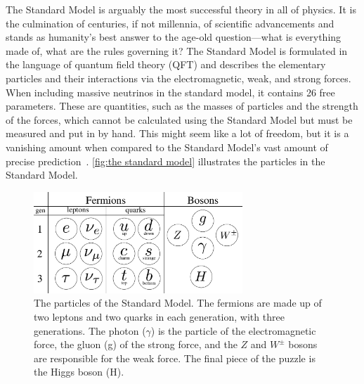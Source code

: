 The Standard Model is arguably the most successful theory in all of physics.
It is the culmination of centuries, if not millennia, of scientific advancements and stands as humanity's best answer to the age-old question---what is everything made of, what are the rules governing it?
The Standard Model is formulated in the language of quantum field theory (QFT) and describes the elementary particles and their interactions via the electromagnetic, weak, and strong forces.
When including massive neutrinos in the standard model, it contains 26 free parameters.
These are quantities, such as the masses of particles and the strength of the forces, which cannot be calculated using the Standard Model but must be measured and put in by hand.
This might seem like a lot of freedom, but it is a vanishing amount when compared to the Standard Model's vast amount of precise prediction~\cite{Schwartz:QFT,griffiths:introduction,kramer:the_standard_model}.
\autoref{fig:the standard model} illustrates the particles in the Standard Model.

\begin{figure}[h]
    \centering
    \includegraphics[width=0.7\textwidth]{figurer/standard_model2.pdf}
    \caption{The particles of the Standard Model. The fermions are made up of two leptons and two quarks in each generation, with three generations. The photon ($\gamma$) is the particle of the electromagnetic force, the gluon (g) of the strong force, and the $Z$ and $W^\pm$ bosons are responsible for the weak force. The final piece of the puzzle is the Higgs boson (H).}
    \label{fig:the standard model}
\end{figure}

